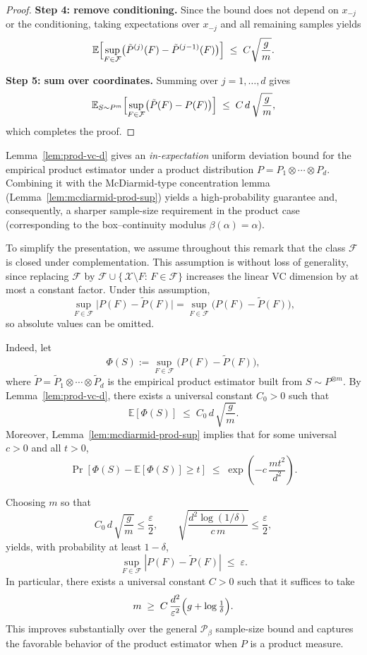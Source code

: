 \documentclass[arxiv]{colt2026}
\newcommand{\X}{\mathcal{X}}
\newcommand{\F}{\mathcal{F}}
\newcommand{\Pc}{\mathcal{P}}
\newcommand{\E}{\mathbb{E}}
\newcommand{\eps}{\varepsilon}
\begin{document}
\begin{proof}
\medskip
\noindent\textbf{Step 4: remove conditioning.}
Since the bound does not depend on $x_{-j}$ or the conditioning,
taking expectations over $x_{-j}$ and all remaining samples yields
\[
\E
\Bigl[
\sup_{F\in\F}
\bigl(\tilde P^{(j)}(F)-\tilde P^{(j-1)}(F)\bigr)
\Bigr]
\;\le\;
C\sqrt{\frac{g}{m}}.
\]

\medskip
\noindent\textbf{Step 5: sum over coordinates.}
Summing over $j=1,\dots,d$ gives
\[
\E_{S\sim P^{m}}
\Bigl[
\sup_{F\in\F} \bigl(\tilde P(F)-P(F)\bigr)
\Bigr]
\;\le\;
C\,d\,\sqrt{\frac{g}{m}},
\]
which completes the proof.
\end{proof}


\begin{remark}
\label{rem:product-high-prob}
Lemma~\ref{lem:prod-vc-d} gives an \emph{in-expectation} uniform deviation bound
for the empirical product estimator under a product distribution
$P=P_1\otimes\cdots\otimes P_d$.
Combining it with the McDiarmid-type concentration lemma
(Lemma~\ref{lem:mcdiarmid-prod-sup}) yields a high-probability guarantee and,
consequently, a sharper sample-size requirement in the product case
(corresponding to the box--continuity modulus $\beta(\alpha)=\alpha$).

To simplify the presentation, we assume throughout this remark that the class
$\F$ is closed under complementation.
This assumption is without loss of generality, since replacing $\F$ by
$\F\cup\{\,\X\setminus F:\,F\in\F\}$ increases the linear VC dimension by at most
a constant factor.
Under this assumption,
\[
\sup_{F\in\F}\bigl|P(F)-\tilde P(F)\bigr|
=
\sup_{F\in\F}\bigl(P(F)-\tilde P(F)\bigr),
\]
so absolute values can be omitted.

Indeed, let
\[
\Phi(S):=\sup_{F\in\F}\bigl(P(F)-\tilde P(F)\bigr),
\]
where $\tilde P=\tilde P_1\otimes\cdots\otimes\tilde P_d$ is the empirical
product estimator built from $S\sim P^{\otimes m}$.
By Lemma~\ref{lem:prod-vc-d}, there exists a universal constant $C_0>0$ such that
\[
\E[\Phi(S)] \;\le\; C_0\,d\,\sqrt{\frac{g}{m}}.
\]
Moreover, Lemma~\ref{lem:mcdiarmid-prod-sup} implies that for some universal
$c>0$ and all $t>0$,
\[
\Pr\!\left[\Phi(S)-\E[\Phi(S)]\ge t\right]
\;\le\;
\exp\!\left(-c\,\frac{m t^2}{d^2}\right).
\]

Choosing $m$ so that
\[
C_0\,d\,\sqrt{\frac{g}{m}}\le \frac{\eps}{2},
\qquad
\sqrt{\frac{d^2\log(1/\delta)}{c\,m}}\le \frac{\eps}{2},
\]
yields, with probability at least $1-\delta$,
\[
\sup_{F\in\F}|P(F)-\tilde P(F)| \;\le\; \eps.
\]
In particular, there exists a universal constant $C>0$ such that it suffices to
take
\[
m \;\ge\; C\,\frac{d^2}{\eps^2}\Bigl(g+\log\tfrac{1}{\delta}\Bigr).
\]
This improves substantially over the general $\Pc_\beta$ sample-size bound and
captures the favorable behavior of the product estimator when $P$ is a product
measure.
\end{remark}
\end{document}
